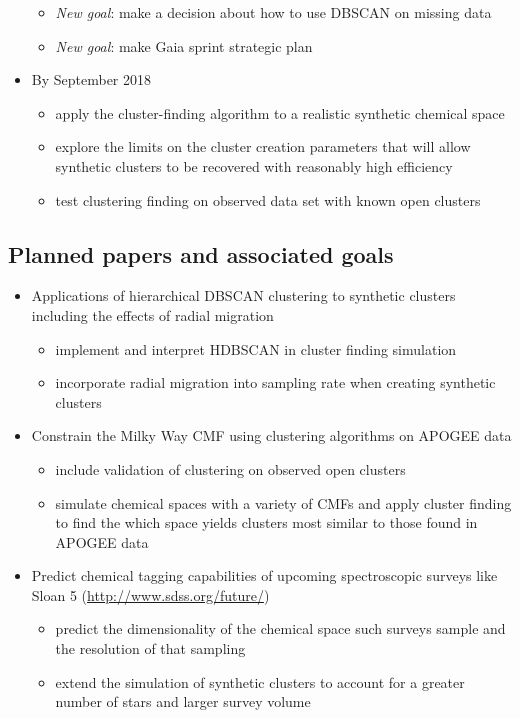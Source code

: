 \documentclass[11pt]{article}
\begin{document}
\begin{itemize}
\begin{itemize}
\item \emph{New goal}: {\color{ForestGreen} make a decision about how to use DBSCAN on missing data}
\item \emph{New goal}: {\color{RoyalBlue} make Gaia sprint strategic plan}
\end{itemize}
\item By September 2018
\begin{itemize}
\item {\color{RoyalBlue}apply the cluster-finding algorithm to a realistic synthetic chemical space} 
\item {\color{ForestGreen} explore the limits on the cluster creation parameters that will allow synthetic clusters to be recovered with reasonably high efficiency}
\item test clustering finding on observed data set with known open clusters
\end{itemize}
\end{itemize}

\subsection*{Planned papers and associated goals}
\begin{itemize}
	\item Applications of hierarchical DBSCAN clustering to synthetic clusters including the effects of radial migration
	\begin{itemize}
	\item implement and interpret HDBSCAN in cluster finding simulation
	\item incorporate radial migration into sampling rate when creating synthetic clusters
	\end{itemize}
	\item Constrain the Milky Way CMF using clustering algorithms on APOGEE data
	\begin{itemize}
	\item include validation of clustering on observed open clusters
	\item simulate chemical spaces with a variety of CMFs and apply cluster finding to find the which space yields clusters most similar to those found in APOGEE data
	\end{itemize}
	\item Predict chemical tagging capabilities of upcoming spectroscopic surveys like Sloan 5 (\url{http://www.sdss.org/future/})
	\begin{itemize}
	\item predict the dimensionality of the chemical space such surveys sample and the resolution of that sampling
	\item extend the simulation of synthetic clusters to account for a greater number of stars and larger survey volume
	\end{itemize}
\end{itemize}
 
\end{document}
